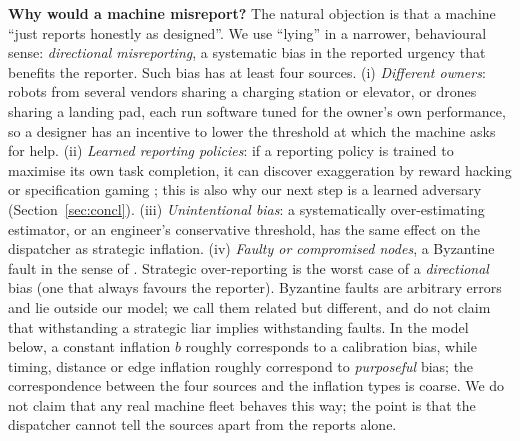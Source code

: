 \documentclass[10pt]{article}
\begin{document}
\textbf{Why would a machine misreport?} The natural objection is that a machine ``just reports honestly as designed''. We use ``lying'' in a narrower, behavioural sense: \emph{directional misreporting}, a systematic bias in the reported urgency that benefits the reporter. Such bias has at least four sources. (i) \emph{Different owners}: robots from several vendors sharing a charging station or elevator, or drones sharing a landing pad, each run software tuned for the owner's own performance, so a designer has an incentive to lower the threshold at which the machine asks for help. (ii) \emph{Learned reporting policies}: if a reporting policy is trained to maximise its own task completion, it can discover exaggeration by reward hacking or specification gaming \citep{amodei2016}; this is also why our next step is a learned adversary (Section~\ref{sec:concl}). (iii) \emph{Unintentional bias}: a systematically over-estimating estimator, or an engineer's conservative threshold, has the same effect on the dispatcher as strategic inflation. (iv) \emph{Faulty or compromised nodes}, a Byzantine fault in the sense of \citet{lamport1982}. Strategic over-reporting is the worst case of a \emph{directional} bias (one that always favours the reporter). Byzantine faults are arbitrary errors and lie outside our model; we call them related but different, and do not claim that withstanding a strategic liar implies withstanding faults. In the model below, a constant inflation $b$ roughly corresponds to a calibration bias, while timing, distance or edge inflation roughly correspond to \emph{purposeful} bias; the correspondence between the four sources and the inflation types is coarse. We do not claim that any real machine fleet behaves this way; the point is that the dispatcher cannot tell the sources apart from the reports alone.
\end{document}
